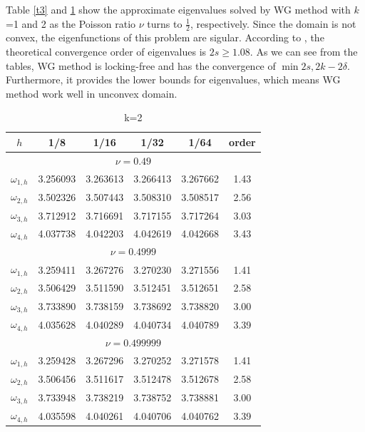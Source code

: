\documentclass[leqno,CJK]{siamltex704}
\numberwithin{equation}{section}
\begin{document}
Table \ref{t3} and \ref{t4} show the approximate eigenvalues solved by WG method with $k$=1 and 2 as the Poisson ratio $\nu$ turns to $\frac{1}{2}$, respectively. Since the domain is not convex, the eigenfunctions of this problem are sigular. According to \cite{Inzunza2023}, the theoretical convergence order of eigenvalues is $2s\ge1.08$. As we can see from the tables, WG method is locking-free and has the convergence of $\min{2s,2k}-2\delta$. Furthermore, it provides the lower bounds for eigenvalues, which means WG method work well in unconvex domain.

\begin{table}[H]
	\begin{center}
		\caption{k=2}\label{t4}
		\begin{tabular}{|c|c|c|c|c|c|}\hline
			$h$&1/8&1/16&1/32&1/64&order\\ \hline\hline
			\multicolumn{6}{|c|}{$\nu=0.49$}\\ \hline
			$\omega_{1,h}$&3.256093 & 3.263613 & 3.266413 & 3.267662 & 1.43 \\
			 \hline
			$\omega_{2,h}$&3.502326 & 3.507443 & 3.508310 & 3.508517 & 2.56 \\
			 \hline
			$\omega_{3,h}$&3.712912 & 3.716691 & 3.717155 & 3.717264 & 3.03 \\
			 \hline
			$\omega_{4,h}$&4.037738 & 4.042203 & 4.042619 & 4.042668 & 3.43 \\
			 \hline
		\multicolumn{6}{|c|}{$\nu=0.4999$}\\ \hline
			$\omega_{1,h}$&3.259411 & 3.267276 & 3.270230 & 3.271556 & 1.41 \\
			 \hline
			$\omega_{2,h}$&3.506429 & 3.511590 & 3.512451 & 3.512651 & 2.58 \\
			\hline
			$\omega_{3,h}$&3.733890 & 3.738159 & 3.738692 & 3.738820 & 3.00 \\ \hline
			$\omega_{4,h}$&4.035628 & 4.040289 & 4.040734 & 4.040789 & 3.39 \\
			\hline
		\multicolumn{6}{|c|}{$\nu=0.499999$}\\ \hline
			$\omega_{1,h}$&3.259428 & 3.267296 & 3.270252 & 3.271578 & 1.41 \\ \hline
			$\omega_{2,h}$&3.506456 & 3.511617 & 3.512478 & 3.512678 & 2.58 \\ 
			\hline
			$\omega_{3,h}$&3.733948 & 3.738219 & 3.738752 & 3.738881 & 3.00 \\
			\hline
			$\omega_{4,h}$&4.035598 & 4.040261 & 4.040706 & 4.040762 & 3.39 \\
		    \hline
		\end{tabular}
	\end{center}
\end{table}
\end{document}
